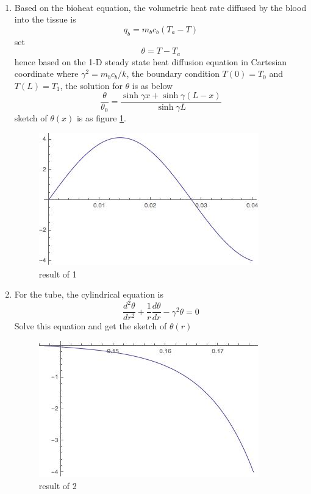 \begin{solution}
~
\begin{enumerate}
\item
Based on the bioheat equation, the volumetric heat rate diffused by the blood into the tissue is 
$$q_b=m_b c_b(T_a-T)$$
set$$\theta = T-T_a$$
hence based on the 1-D steady state heat diffusion equation in Cartesian coordinate
where $\gamma^2=m_b c_b/k$, the boundary condition $T(0)=T_0$ and  $T(L)=T_1$,
the solution for $\theta$ is as below
$$\frac{\theta}{\theta_0}=\frac{\sinh\gamma x+\sinh\gamma(L-x)}{\sinh\gamma L}$$
sketch of $\theta(x)$ is as figure \ref{fig:2:10}.
\begin{figure}[h!]
  \centering
    \includegraphics[scale=0.6]{figures/ch2/10}
    \caption{result of 1}
    \label{fig:2:10}
\end{figure}
\item
For the tube, the cylindrical equation is
$$\frac{d^2 \theta}{dr^2} + \frac{1}{r}\frac{d\theta}{dr}-\gamma^2\theta=0$$
Solve this equation and get the sketch of $\theta(r)$
\begin{figure}[h!]
  \centering
    \includegraphics[scale=0.8]{figures/ch2/11}
    \caption{result of 2}
    \label{fig:2:11}
\end{figure}
\end{enumerate}
\end{solution}

